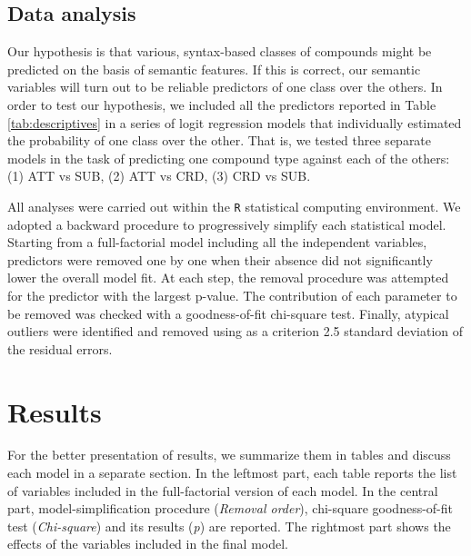 \documentclass[output=paper]{langsci/langscibook}
\begin{document}
\subsection{Data analysis}


Our hypothesis is that various, syntax-based classes of compounds might be predicted on the basis of semantic features. If this is correct, our semantic variables will turn out to be reliable predictors of one class over the others. In order to test our hypothesis, we included all the predictors reported in Table \ref{tab:descriptives} in a series of logit regression models that individually estimated the probability of one class over the other. That is, we tested three separate models in the task of predicting one compound type against each of the others: (1) ATT vs SUB, (2) ATT vs CRD, (3) CRD vs SUB.

All analyses were carried out within the \texttt{R} statistical computing environment. We adopted a backward procedure to progressively simplify each statistical model. Starting from a full-factorial model including all the independent variables, predictors were removed one by one when their absence did not significantly lower the overall model fit. At each step, the removal procedure was attempted for the predictor with the largest p-value. The contribution of each parameter to be removed was checked with a goodness-of-fit chi-square test. Finally, atypical outliers were identified and removed using as a criterion 2.5 standard deviation of the residual errors.


\section{Results}
\label{sec:results}


For the better presentation of results, we summarize them in tables and discuss each model in a separate section. In the leftmost part, each table reports the list of variables included in the full-factorial version of each model. In the central part, model-simplification procedure (\emph{Removal order}), chi-square goodness-of-fit test (\emph{Chi-square}) and its results (\emph{p}) are reported. The rightmost part shows the effects of the variables included in the final model.
\end{document}
